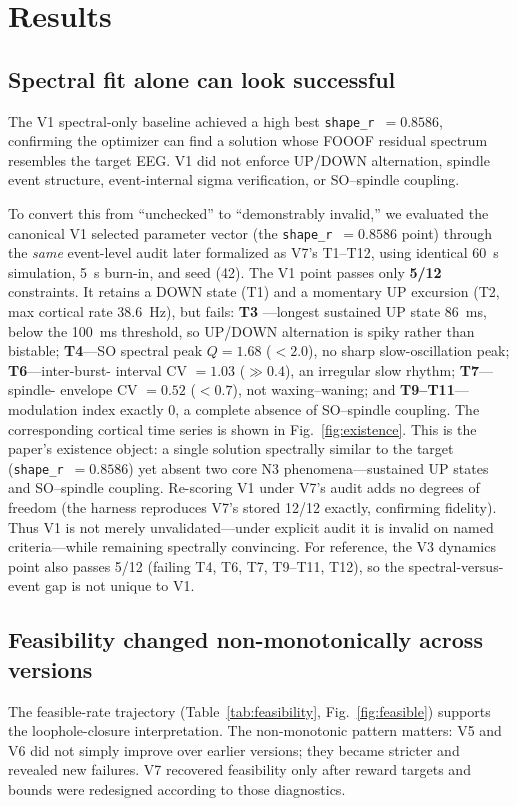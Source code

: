\documentclass[conference]{IEEEtran}
\newcommand{\code}[1]{\texttt{#1}}
\begin{document}
\section{Results}
\subsection{Spectral fit alone can look successful}\label{sec:resultsA}
The V1 spectral-only baseline achieved a high best \code{shape\_r}~$=0.8586$,
confirming the optimizer can find a solution whose FOOOF residual spectrum
resembles the target EEG. V1 did not enforce UP/DOWN alternation, spindle event
structure, event-internal sigma verification, or SO--spindle coupling.

To convert this from ``unchecked'' to ``demonstrably invalid,'' we evaluated the
canonical V1 selected parameter vector (the \code{shape\_r}~$=0.8586$ point)
through the \emph{same} event-level audit later formalized as V7's T1--T12,
using identical 60~s simulation, 5~s burn-in, and seed (42). The V1 point
passes only \textbf{5/12} constraints. It retains a DOWN state (T1) and a
momentary UP excursion (T2, max cortical rate 38.6~Hz), but fails: \textbf{T3}
---longest sustained UP state 86~ms, below the 100~ms threshold, so UP/DOWN
alternation is spiky rather than bistable; \textbf{T4}---SO spectral peak
$Q=1.68$ ($<2.0$), no sharp slow-oscillation peak; \textbf{T6}---inter-burst-
interval CV $=1.03$ ($\gg 0.4$), an irregular slow rhythm; \textbf{T7}---spindle-
envelope CV $=0.52$ ($<0.7$), not waxing--waning; and \textbf{T9--T11}---
modulation index exactly 0, a complete absence of SO--spindle coupling. The
corresponding cortical time series is shown in Fig.~\ref{fig:existence}. This is
the paper's existence object: a single solution spectrally similar to the target
(\code{shape\_r}~$=0.8586$) yet absent two core N3 phenomena---sustained UP
states and SO--spindle coupling. Re-scoring V1 under V7's audit adds no degrees
of freedom (the harness reproduces V7's stored 12/12 exactly, confirming
fidelity). Thus V1 is not merely unvalidated---under explicit audit it is
invalid on named criteria---while remaining spectrally convincing. For
reference, the V3 dynamics point also passes 5/12 (failing T4, T6, T7, T9--T11,
T12), so the spectral-versus-event gap is not unique to V1.

\subsection{Feasibility changed non-monotonically across versions}\label{sec:resultsB}
The feasible-rate trajectory (Table~\ref{tab:feasibility},
Fig.~\ref{fig:feasible}) supports the loophole-closure interpretation. The non-monotonic pattern matters: V5 and V6
did not simply improve over earlier versions; they became stricter and revealed
new failures. V7 recovered feasibility only after reward targets and bounds were
redesigned according to those diagnostics.
\end{document}
